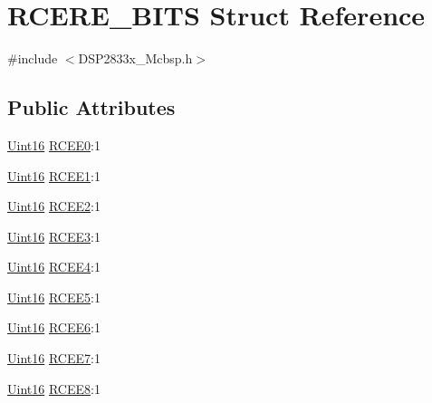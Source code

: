 \hypertarget{struct_r_c_e_r_e___b_i_t_s}{}\section{R\+C\+E\+R\+E\+\_\+\+B\+I\+T\+S Struct Reference}
\label{struct_r_c_e_r_e___b_i_t_s}


{\ttfamily \#include $<$D\+S\+P2833x\+\_\+\+Mcbsp.\+h$>$}

\subsection*{Public Attributes}
\begin{DoxyCompactItemize}
\item 
\hyperlink{_d_s_p2833x___device_8h_a59a9f6be4562c327cbfb4f7e8e18f08b}{Uint16} \hyperlink{struct_r_c_e_r_e___b_i_t_s_ad2db1b9eadf51fde66ddb430f88e3005}{R\+C\+E\+E0}\+:1
\item 
\hyperlink{_d_s_p2833x___device_8h_a59a9f6be4562c327cbfb4f7e8e18f08b}{Uint16} \hyperlink{struct_r_c_e_r_e___b_i_t_s_a4a021330a20a8141b28a544a00bc5f7f}{R\+C\+E\+E1}\+:1
\item 
\hyperlink{_d_s_p2833x___device_8h_a59a9f6be4562c327cbfb4f7e8e18f08b}{Uint16} \hyperlink{struct_r_c_e_r_e___b_i_t_s_a19bf4d13d2e390928bd87ae13cac4af2}{R\+C\+E\+E2}\+:1
\item 
\hyperlink{_d_s_p2833x___device_8h_a59a9f6be4562c327cbfb4f7e8e18f08b}{Uint16} \hyperlink{struct_r_c_e_r_e___b_i_t_s_a2d842b4153759fc77380844d5100e545}{R\+C\+E\+E3}\+:1
\item 
\hyperlink{_d_s_p2833x___device_8h_a59a9f6be4562c327cbfb4f7e8e18f08b}{Uint16} \hyperlink{struct_r_c_e_r_e___b_i_t_s_a46cf5fd9ad53052768d611da6b021f47}{R\+C\+E\+E4}\+:1
\item 
\hyperlink{_d_s_p2833x___device_8h_a59a9f6be4562c327cbfb4f7e8e18f08b}{Uint16} \hyperlink{struct_r_c_e_r_e___b_i_t_s_a806259ce4dbf29be106ef42cffc6e0e9}{R\+C\+E\+E5}\+:1
\item 
\hyperlink{_d_s_p2833x___device_8h_a59a9f6be4562c327cbfb4f7e8e18f08b}{Uint16} \hyperlink{struct_r_c_e_r_e___b_i_t_s_a79c31d4b9794743b02e1fb5dcbc0279f}{R\+C\+E\+E6}\+:1
\item 
\hyperlink{_d_s_p2833x___device_8h_a59a9f6be4562c327cbfb4f7e8e18f08b}{Uint16} \hyperlink{struct_r_c_e_r_e___b_i_t_s_a16e0752fe213f6b96f243f046ed6b277}{R\+C\+E\+E7}\+:1
\item 
\hyperlink{_d_s_p2833x___device_8h_a59a9f6be4562c327cbfb4f7e8e18f08b}{Uint16} \hyperlink{struct_r_c_e_r_e___b_i_t_s_a58bd59d712ea07a4440bec076b88b0f7}{R\+C\+E\+E8}\+:1

\end{DoxyCompactItemize}
